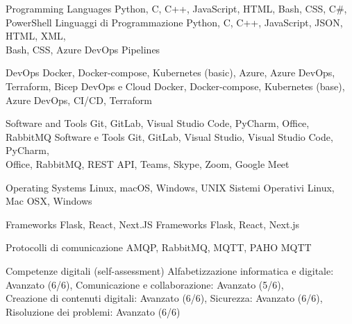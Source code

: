 \begin{cvskills}


\ifenglish
\cvskill
{Programming Languages} %
{Python, C, C++, JavaScript, HTML, Bash, CSS, C#, PowerShell} %
\else
\cvskill
{Linguaggi di Programmazione} %
{Python, C, C++, JavaScript, JSON, HTML, XML,\\
 Bash, CSS, Azure DevOps Pipelines} %
\fi


\ifenglish
\cvskill
{DevOps} %
{Docker, Docker-compose, Kubernetes (basic), Azure, Azure DevOps, Terraform, Bicep} %
\else
\cvskill
{DevOps e Cloud} %
{Docker, Docker-compose, Kubernetes (base),\\
 Azure DevOps, CI/CD, Terraform} %
\fi


\ifenglish
\cvskill
{Software and Tools} %
{Git, GitLab, Visual Studio Code, PyCharm, Office, RabbitMQ} %
\else
\cvskill
{Software e Tools} %
{Git, GitLab, Visual Studio, Visual Studio Code, PyCharm,\\
 Office, RabbitMQ, REST API, Teams, Skype, Zoom, Google Meet} %
\fi


\ifenglish
\cvskill
{Operating Systems} %
{Linux, macOS, Windows, UNIX} %
\else
\cvskill
{Sistemi Operativi} %
{Linux, Mac OSX, Windows} %
\fi


\ifenglish
\cvskill
{Frameworks} %
{Flask, React, Next.JS} %
\else
\cvskill
{Frameworks} %
{Flask, React, Next.js} %
\fi


\ifenglish
\else
\cvskill
{Protocolli di comunicazione} %
{AMQP, RabbitMQ, MQTT, PAHO MQTT} %


\cvskill
{Competenze digitali (self-assessment)} %
{Alfabetizzazione informatica e digitale: Avanzato (6/6), Comunicazione e collaborazione: Avanzato (5/6),\\
 Creazione di contenuti digitali: Avanzato (6/6), Sicurezza: Avanzato (6/6), Risoluzione dei problemi: Avanzato (6/6)} %
\fi


\end{cvskills}